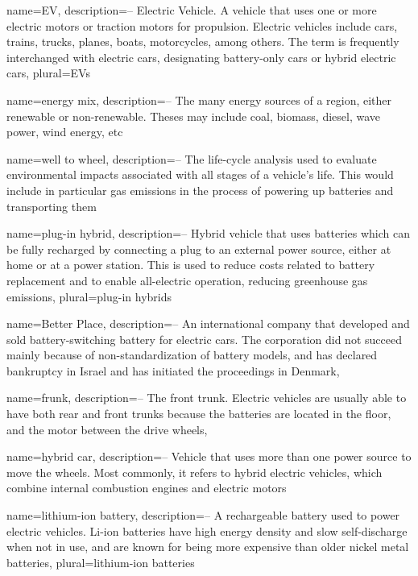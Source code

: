 
{
  name=EV,
  description={-- Electric Vehicle. A vehicle that uses one or more electric motors or traction motors for propulsion. Electric vehicles include cars, trains, trucks, planes, boats, motorcycles, among others. The term is frequently interchanged with electric cars, designating battery-only cars or hybrid electric cars},
  plural=EVs
}

{
  name=energy mix,
  description={-- The many energy sources of a region, either renewable or non-renewable. Theses may include coal, biomass, diesel, wave power, wind energy, etc}
}

{
  name=well to wheel,
  description={-- The life-cycle analysis used to evaluate environmental impacts associated with all stages of a vehicle's life. This would include in particular gas emissions in the process of powering up batteries and transporting them}
}

{
  name=plug-in hybrid,
  description={-- Hybrid vehicle that uses batteries which can be fully recharged by connecting a plug to an external power source, either at home or at a power station. This is used to reduce costs related to battery replacement and to enable all-electric operation, reducing greenhouse gas emissions},
  plural=plug-in hybrids
}

{
  name=Better Place,
  description={-- An international company that developed and sold battery-switching battery for electric cars. The corporation did not succeed mainly because of non-standardization of battery models, and has declared bankruptcy in Israel and has initiated the proceedings in Denmark},
}


{
  name=frunk,
  description={-- The front trunk. Electric vehicles are usually able to have both rear and front trunks because the batteries are located in the floor, and the motor between the drive wheels},
}

{
	name=hybrid car,
	description={-- Vehicle that uses more than one power source to move the wheels. Most commonly, it refers to hybrid electric vehicles, which combine internal combustion engines and electric motors}
}

{
	name=lithium-ion battery,
	description={-- A rechargeable battery used to power electric vehicles. Li-ion batteries have high energy density and slow self-discharge when not in use, and are known for being more expensive than older nickel metal batteries},
	plural=lithium-ion batteries
}

